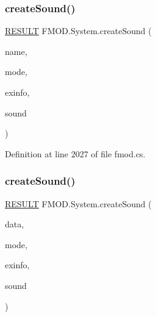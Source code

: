 \subsubsection{\texorpdfstring{create\+Sound()}{createSound()}\hspace{0.1cm}{\footnotesize\ttfamily [1/3]}}
{\footnotesize\ttfamily \hyperlink{namespace_f_m_o_d_a305d1176ef3f8c8815861a60407ac33d}{R\+E\+S\+U\+LT} F\+M\+O\+D.\+System.\+create\+Sound (\begin{DoxyParamCaption}\item[{string}]{name,  }\item[{\hyperlink{namespace_f_m_o_d_a94ab158a8314f5f4248f1aea55dbefa3}{M\+O\+DE}}]{mode,  }\item[{ref \hyperlink{struct_f_m_o_d_1_1_c_r_e_a_t_e_s_o_u_n_d_e_x_i_n_f_o}{C\+R\+E\+A\+T\+E\+S\+O\+U\+N\+D\+E\+X\+I\+N\+FO}}]{exinfo,  }\item[{out \hyperlink{class_f_m_o_d_1_1_sound}{Sound}}]{sound }\end{DoxyParamCaption})}



Definition at line 2027 of file fmod.\+cs.

\mbox{\label{class_f_m_o_d_1_1_system_a6a90f637778db9d17e98cabc896e61e9}} 
\subsubsection{\texorpdfstring{create\+Sound()}{createSound()}\hspace{0.1cm}{\footnotesize\ttfamily [2/3]}}
{\footnotesize\ttfamily \hyperlink{namespace_f_m_o_d_a305d1176ef3f8c8815861a60407ac33d}{R\+E\+S\+U\+LT} F\+M\+O\+D.\+System.\+create\+Sound (\begin{DoxyParamCaption}\item[{byte \mbox{[}$\,$\mbox{]}}]{data,  }\item[{\hyperlink{namespace_f_m_o_d_a94ab158a8314f5f4248f1aea55dbefa3}{M\+O\+DE}}]{mode,  }\item[{ref \hyperlink{struct_f_m_o_d_1_1_c_r_e_a_t_e_s_o_u_n_d_e_x_i_n_f_o}{C\+R\+E\+A\+T\+E\+S\+O\+U\+N\+D\+E\+X\+I\+N\+FO}}]{exinfo,  }\item[{out \hyperlink{class_f_m_o_d_1_1_sound}{Sound}}]{sound }\end{DoxyParamCaption})}



